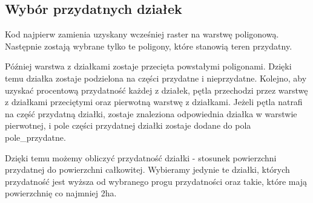 \documentclass{article}
\begin{document}
\newpage

\subsection{Wybór przydatnych działek}
Kod najpierw zamienia uzyskany wcześniej raster na warstwę poligonową. Następnie zostają wybrane tylko te poligony, które stanowią teren przydatny.

Później warstwa z działkami zostaje przecięta powstałymi poligonami. Dzięki temu działka zostaje podzielona na części przydatne i nieprzydatne. Kolejno, aby uzyskać procentową przydatność każdej z działek, pętla przechodzi przez warstwę z działkami przeciętymi oraz pierwotną warstwę z działkami. 
Jeżeli pętla natrafi na część przydatną działki, zostaje znaleziona odpowiednia działka w warstwie pierwotnej, i pole części przydatnej działki zostaje dodane do pola pole\_przydatne.

Dzięki temu możemy obliczyć przydatność działki - stosunek powierzchni przydatnej do powierzchni całkowitej. Wybieramy jedynie te działki, których przydatność jest wyższa od wybranego progu przydatności oraz takie, które mają powierzchnię co najmniej 2ha.
\end{document}
